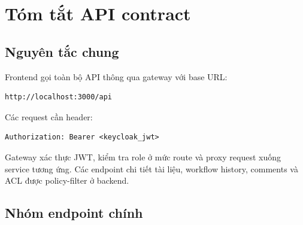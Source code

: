 \chapter{Tóm tắt API contract}

\section{Nguyên tắc chung}

Frontend gọi toàn bộ API thông qua gateway với base URL:

\begin{lstlisting}
http://localhost:3000/api
\end{lstlisting}

Các request cần header:

\begin{lstlisting}
Authorization: Bearer <keycloak_jwt>
\end{lstlisting}

Gateway xác thực JWT, kiểm tra role ở mức route và proxy request xuống service tương ứng. Các endpoint chi tiết tài liệu, workflow history, comments và ACL được policy-filter ở backend.

\section{Nhóm endpoint chính}

